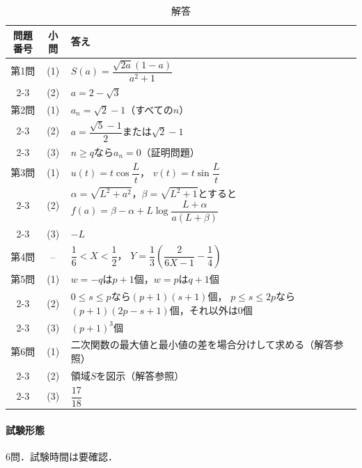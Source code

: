 \documentclass[../../main.tex]{subfiles}
\begin{document}
\begin{table}[htb]
  \centering
  \caption{解答}
  \renewcommand{\arraystretch}{1.4}
  \begin{tabular}{|c|c|p{9cm}|}
    \hline
    \textbf{問題番号} & \textbf{小問} & \textbf{答え} \\
    \hline
    第1問 & (1) & $S(a)=\dfrac{\sqrt{2a}(1-a)}{a^2+1}$ \\
    \cline{2-3}
    & (2) & $a=2-\sqrt{3}$ \\
    \hline
    第2問 & (1) & $a_n=\sqrt{2}-1$（すべての$n$） \\
    \cline{2-3}
    & (2) & $a=\dfrac{\sqrt{5}-1}{2}$または$\sqrt{2}-1$ \\
    \cline{2-3}
    & (3) & $n\ge q$なら$a_n=0$（証明問題） \\
    \hline
    第3問 & (1) & $u(t)=t\cos\dfrac{L}{t}$，
    $v(t)=t\sin\dfrac{L}{t}$ \\
    \cline{2-3}
    & (2) & $\alpha=\sqrt{L^2+a^2}$，$\beta=\sqrt{L^2+1}$とすると
    $f(a)=\beta-\alpha+L\log\dfrac{L+\alpha}{a(L+\beta)}$ \\
    \cline{2-3}
    & (3) & $-L$ \\
    \hline
    第4問 & -- & $\dfrac{1}{6}<X<\dfrac{1}{2}$，
    $Y=\dfrac{1}{3}\left(\dfrac{2}{6X-1}-\dfrac{1}{4}\right)$ \\
    \hline
    第5問 & (1) & $w=-q$は$p+1$個，$w=p$は$q+1$個 \\
    \cline{2-3}
    & (2) & $0\le s\le p$なら$(p+1)(s+1)$個，
    $p\le s\le2p$なら$(p+1)(2p-s+1)$個，それ以外は$0$個 \\
    \cline{2-3}
    & (3) & $(p+1)^3$個 \\
    \hline
    第6問 & (1) & 二次関数の最大値と最小値の差を場合分けして求める（解答参照） \\
    \cline{2-3}
    & (2) & 領域$S$を図示（解答参照） \\
    \cline{2-3}
    & (3) & $\dfrac{17}{18}$ \\
    \hline
  \end{tabular}
\end{table}

\paragraph{試験形態}
6問．試験時間は要確認．
\end{document}
